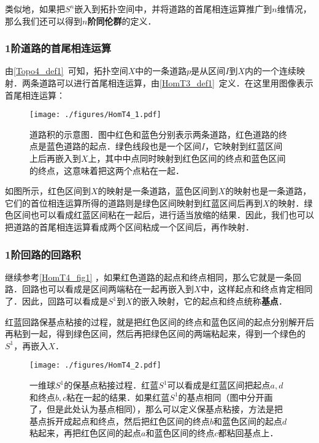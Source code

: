 类似地，如果把$S^n$嵌入到拓扑空间中，并将道路的首尾相连运算推广到$n$维情况，那么我们还可以得到$n$\textbf{阶同伦群}的定义．

\subsubsection{1阶道路的首尾相连运算}

由\autoref{Topo4_def1}~可知，拓扑空间$X$中的一条道路$p$是从区间$I$到$X$内的一个连续映射．两条道路可以进行首尾相连运算，由\autoref{HomT3_def1}~定义．在这里用图像表示首尾相连运算：


\begin{figure}[ht]
\centering
\texttt{[image: ./figures/HomT4\_1.pdf]}
\caption{道路积的示意图．图中红色和蓝色分别表示两条道路，红色道路的终点是蓝色道路的起点．绿色线段也是一个区间$I$，它映射到红蓝区间上后再嵌入到$X$上，其中中点同时映射到红色区间的终点和蓝色区间的终点，这意味着把这两个点粘在一起．} \label{HomT4_fig1}
\end{figure}

如图所示，红色区间到$X$的映射是一条道路，蓝色区间到$X$的映射也是一条道路，它们的首位相连运算所得的道路则是绿色区间映射到红蓝区间后再到$X$的映射．绿色区间也可以看成红蓝区间粘在一起后，进行适当放缩的结果．因此，我们也可以把道路的首尾相连运算看成两个区间粘成一个区间后，再作映射．

\subsubsection{1阶回路的回路积}

继续参考\autoref{HomT4_fig1} ，如果红色道路的起点和终点相同，那么它就是一条回路．回路也可以看成是区间两端粘在一起再嵌入到$X$中，这样起点和终点肯定相同了．因此，回路可以看成是$S^1$到$X$的嵌入映射，它的起点和终点统称\textbf{基点}．

红蓝回路保基点粘接的过程，就是把红色区间的终点和蓝色区间的起点分别解开后再粘到一起，得到绿色区间，然后再把绿色区间的两端粘起来，得到一个绿色的$S^1$，再嵌入$X$．

\begin{figure}[ht]
\centering
\texttt{[image: ./figures/HomT4\_2.pdf]}
\caption{一维球$S^1$的保基点粘接过程．红蓝$S^1$可以看成是红蓝区间把起点$a, d$和终点$b, c$粘在一起的结果．如果红蓝$S^1$的基点相同（图中分开画了，但是此处认为基点相同），那么可以定义保基点粘接，方法是把基点拆开成起点和终点，然后把红色区间的终点$b$和蓝色区间的起点$d$粘起来，再把红色区间的起点$a$和蓝色区间的终点$c$都粘回基点上．} \label{HomT4_fig2}
\end{figure}

